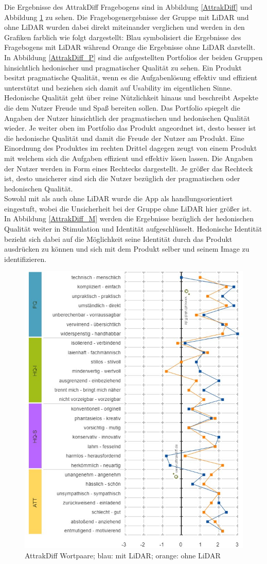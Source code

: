 \documentclass[12pt,a4paper]{article}
\begin{document}
Die Ergebnisse des AttrakDiff Fragebogens sind in Abbildung \ref{AttrakDiff} und Abbildung \ref{AttrakDiff_WP} zu sehen. Die Fragebogenergebnisse der Gruppe mit LiDAR und ohne LiDAR wurden dabei direkt miteinander verglichen und werden in den Grafiken farblich wie folgt dargestellt: Blau symbolisiert die Ergebnisse des Fragebogens mit LiDAR während Orange die Ergebnisse ohne LiDAR darstellt.\\
In Abbildung \ref{AttrakDiff_P} sind die aufgestellten Portfolios der beiden Gruppen hinsichtlich hedonischer und pragmatischer Qualität zu sehen. Ein Produkt besitzt pragmatische Qualität, wenn es die Aufgabenlösung effektiv und effizient unterstützt und beziehen sich damit auf Usability im eigentlichen Sinne. Hedonische Qualität geht über reine Nützlichkeit hinaus und beschreibt Aspekte die dem Nutzer Freude und Spaß bereiten sollen. Das Portfolio spiegelt die Angaben der Nutzer hinsichtlich der pragmatischen und hedonischen Qualität wieder. Je weiter oben im Portfolio das Produkt angeordnet ist, desto besser ist die hedonische Qualität und damit die Freude der Nutzer am Produkt. Eine Einordnung des Produktes im rechten Drittel dagegen zeugt von einem Produkt mit welchem sich die Aufgaben effizient und effektiv lösen lassen. Die Angaben der Nutzer werden in Form eines Rechtecks dargestellt. Je größer das Rechteck ist, desto unsicherer sind sich die Nutzer bezüglich der pragmatischen oder hedonischen Qualität. \\ 
Sowohl mit als auch ohne LiDAR wurde die App als \glqq handlungsorientiert\grqq{} eingestuft, wobei die Unsicherheit bei der Gruppe ohne LiDAR hier größer ist.\\
In Abbildung \ref{AttrakDiff_M} werden die Ergebnisse bezüglich der hedonischen Qualität weiter in Stimulation und Identität aufgeschlüsselt. Hedonische Identität bezieht sich dabei auf die Möglichkeit seine Identität durch das Produkt ausdrücken zu können und sich mit dem Produkt selber und seinem Image zu identifizieren.

\begin{figure}[h!]
\centering
\includegraphics[width=.6\textwidth]{AttrakDiff_Wortpaare}
\caption{AttrakDiff Wortpaare; blau: mit LiDAR; orange: ohne LiDAR}
\label{AttrakDiff_WP}
\end{figure}
\end{document}
